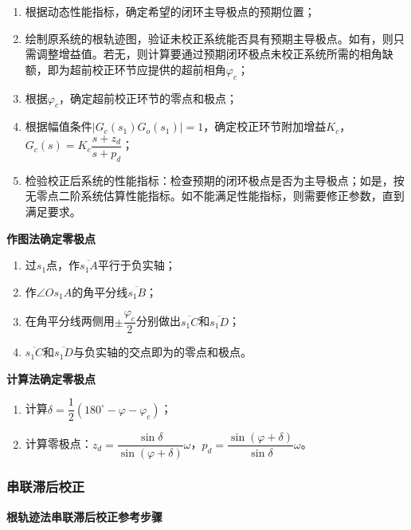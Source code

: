 \documentclass[cn, blue, normal, 12pt]{elegantnote}
\begin{document}
\begin{enumerate}
    \setlength{\itemsep}{6pt}
    \item 根据动态性能指标，确定希望的闭环主导极点的预期位置；
    \item 绘制原系统的根轨迹图，验证未校正系统能否具有预期主导极点。如有，则只需调整增益值。若无，则计算要通过预期闭环极点未校正系统所需的相角缺额，即为超前校正环节应提供的超前相角$\varphi_c$；
    \item 根据$\varphi_c$，确定超前校正环节的零点和极点；
    \item 根据幅值条件$|G_c(s_1)G_o(s_1)|=1$，确定校正环节附加增益$K_c$，$G_c(s)=K_c\dfrac{s+z_d}{s+p_d}$；
    \item 检验校正后系统的性能指标：检查预期的闭环极点是否为主导极点；如是，按无零点二阶系统估算性能指标。如不能满足性能指标，则需要修正参数，直到满足要求。
\end{enumerate}

\textbf{作图法确定零极点}

\begin{enumerate}
    \setlength{\itemsep}{6pt}
    \item 过$s_1$点，作$\overline{s_1 A}$平行于负实轴；
    \item 作$\angle O s_1 A$的角平分线$\overline{s_1 B}$；
    \item 在角平分线两侧用$\pm\dfrac{\varphi_c}{2}$分别做出$\overline{s_1 C}$和$\overline{s_1 D}$；
    \item $\overline{s_1 C}$和$\overline{s_1 D}$与负实轴的交点即为的零点和极点。
\end{enumerate}

\textbf{计算法确定零极点}

\begin{enumerate}
    \setlength{\itemsep}{6pt}
    \item 计算$\delta=\dfrac{1}{2}(180^{\circ}-\varphi-\varphi_c)$；
    \item 计算零极点：$z_d=\dfrac{\sin{\delta}}{\sin{(\varphi+\delta)}}\omega$，$p_d=\dfrac{\sin{(\varphi+\delta)}}{\sin{\delta}}\omega$。
\end{enumerate}

\subsubsection{串联滞后校正}

\textbf{根轨迹法串联滞后校正参考步骤}
\end{document}
